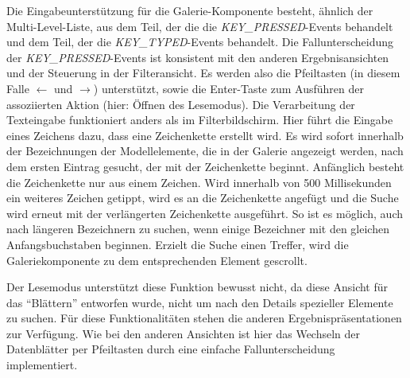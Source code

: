Die Eingabeunterstützung für die Galerie-Komponente besteht, ähnlich der Multi-Level-Liste, aus dem Teil, der die die \textit{KEY\_{}PRESSED}-Events behandelt und dem Teil, der die \textit{KEY\_{}TYPED}-Events behandelt. Die Fallunterscheidung der \textit{KEY\_{}PRESSED}-Events ist konsistent mit den anderen Ergebnisansichten und der Steuerung in der Filteransicht. Es werden also die Pfeiltasten (in diesem Falle $\leftarrow$ und $\rightarrow$) unterstützt, sowie die Enter-Taste zum Ausführen der assoziierten Aktion (hier: Öffnen des Lesemodus). Die Verarbeitung der Texteingabe funktioniert anders als im Filterbildschirm. Hier führt die Eingabe eines Zeichens dazu, dass eine Zeichenkette erstellt wird. Es wird sofort innerhalb der Bezeichnungen der Modellelemente, die in der Galerie angezeigt werden, nach dem ersten Eintrag gesucht, der mit der Zeichenkette beginnt. Anfänglich besteht die Zeichenkette nur aus einem Zeichen. Wird innerhalb von 500 Millisekunden ein weiteres Zeichen getippt, wird es an die Zeichenkette angefügt und die Suche wird erneut mit der verlängerten Zeichenkette ausgeführt. So ist es möglich, auch nach längeren Bezeichnern zu suchen, wenn einige Bezeichner mit den gleichen Anfangsbuchstaben beginnen. Erzielt die Suche einen Treffer, wird die Galeriekomponente zu dem entsprechenden Element gescrollt.\par
Der Lesemodus unterstützt diese Funktion bewusst nicht, da diese Ansicht für das \enquote{Blättern} entworfen wurde, nicht um nach den Details spezieller Elemente zu suchen. Für diese Funktionalitäten stehen die anderen Ergebnispräsentationen zur Verfügung. Wie bei den anderen Ansichten ist hier das Wechseln der Datenblätter per Pfeiltasten durch eine einfache Fallunterscheidung implementiert. \par